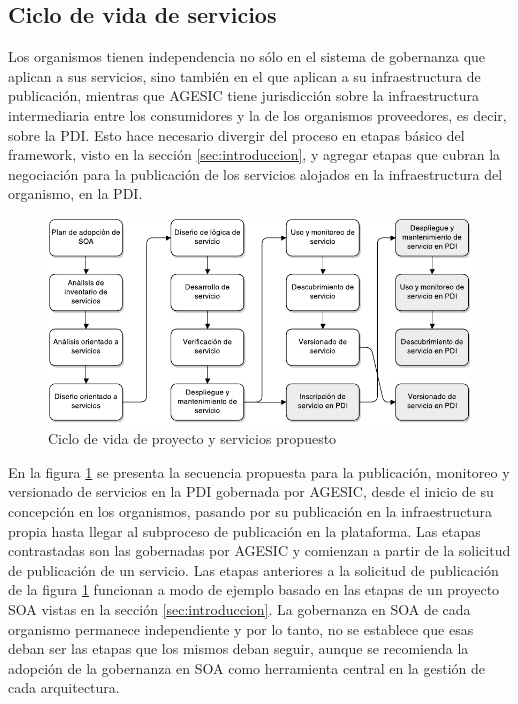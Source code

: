 \documentclass[11pt]{article}
\begin{document}
		\subsection{Ciclo de vida de servicios}
			\label{subsec:ciclo_de_vida}
			Los organismos tienen independencia no sólo en el sistema de gobernanza que aplican a sus servicios, sino también en el que aplican a su infraestructura de publicación, mientras que AGESIC tiene jurisdicción sobre la infraestructura intermediaria entre los consumidores y la de los organismos proveedores, es decir, sobre la PDI. Esto hace necesario divergir del proceso en etapas básico del framework, visto en la sección \ref{sec:introduccion}, y agregar etapas que cubran la negociación para la publicación de los servicios alojados en la infraestructura del organismo, en la PDI.

			\begin{figure}[h]
				\centering
				\includegraphics[width=\linewidth]{ciclo_de_vida_propuesta}
				\caption{Ciclo de vida de proyecto y servicios propuesto}
				\label{imagen:ciclo_de_vida_propuesta}
			\end{figure}

			En la figura \ref{imagen:ciclo_de_vida_propuesta} se presenta la secuencia propuesta para la publicación, monitoreo y versionado de servicios en la PDI gobernada por AGESIC, desde el inicio de su concepción en los organismos, pasando por su publicación en la infraestructura propia hasta llegar al subproceso de publicación en la plataforma. Las etapas contrastadas son las gobernadas por AGESIC y comienzan a partir de la solicitud de publicación de un servicio. Las etapas anteriores a la solicitud de publicación de la figura \ref{imagen:ciclo_de_vida_propuesta} funcionan a modo de ejemplo basado en las etapas de un proyecto SOA vistas en la sección \ref{sec:introduccion}. La gobernanza en SOA de cada organismo permanece independiente y por lo tanto, no se establece que esas deban ser las etapas que los mismos deban seguir, aunque se recomienda la adopción de la gobernanza en SOA como herramienta central en la gestión de cada arquitectura.
\end{document}

